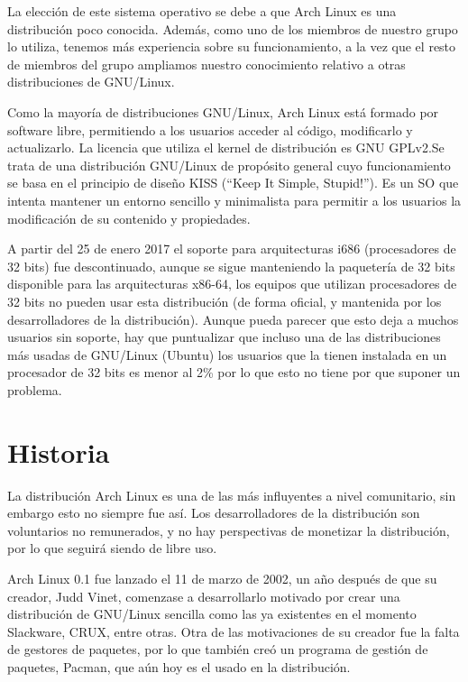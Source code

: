 \documentclass[12pt, spanish]{article}
\begin{document}
La elección de este sistema operativo se debe a que Arch Linux es una distribución poco conocida. Además, como uno de los miembros de nuestro grupo lo utiliza, tenemos más experiencia sobre su funcionamiento, a la vez que el resto de miembros del grupo ampliamos nuestro conocimiento relativo a otras distribuciones de GNU/Linux.

Como la mayoría de distribuciones GNU/Linux, Arch Linux está formado por software libre, permitiendo a los usuarios acceder al código, modificarlo y actualizarlo. La licencia que utiliza el kernel de distribución es GNU GPLv2.Se trata de una distribución GNU/Linux de propósito general cuyo funcionamiento se basa en el principio de diseño KISS (“Keep It Simple, Stupid!”). Es un SO que intenta mantener un entorno sencillo y minimalista para permitir a los usuarios la modificación de su contenido y propiedades.


A partir del 25 de enero 2017 el soporte para arquitecturas i686 (procesadores de 32 bits) fue descontinuado, aunque se sigue manteniendo la paquetería de 32 bits disponible para las arquitecturas x86-64, los equipos que utilizan procesadores de 32 bits no pueden usar esta distribución (de forma oficial, y mantenida por los desarrolladores de la distribución). Aunque pueda parecer que esto deja a muchos usuarios sin soporte, hay que puntualizar que incluso una de las distribuciones más usadas de GNU/Linux (Ubuntu) los usuarios que la tienen instalada en un procesador de 32 bits es menor al 2\% por lo que esto no tiene por que suponer un problema.


\section{Historia}

La distribución Arch Linux es una de las más influyentes a nivel comunitario, sin embargo esto no siempre fue así. Los desarrolladores de la distribución son voluntarios no remunerados, y no hay perspectivas de monetizar la distribución, por lo que seguirá siendo de libre uso.

Arch Linux 0.1 fue lanzado el 11 de marzo de 2002, un año después de que su creador, Judd Vinet, comenzase a desarrollarlo motivado por crear una distribución de GNU/Linux sencilla como las ya existentes en el momento Slackware, CRUX, entre otras. Otra de las motivaciones de su creador fue la falta de gestores de paquetes, por lo que también creó un programa de gestión de paquetes, Pacman, que aún hoy es el usado en la distribución.
\end{document}
